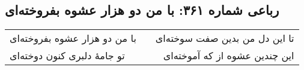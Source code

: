 \begin{center}
\section*{رباعی شماره ۳۶۱: با من دو هزار عشوه بفروخته‌ای}
\label{sec:sh361}
\begin{longtable}{l p{0.5cm} r}
با من دو هزار عشوه بفروخته‌ای
&&
تا این دل من بدین صفت سوخته‌ای
\\
تو جامهٔ دلبری کنون دوخته‌ای
&&
این چندین عشوه از که آموخته‌ای
\\
\end{longtable}
\end{center}
